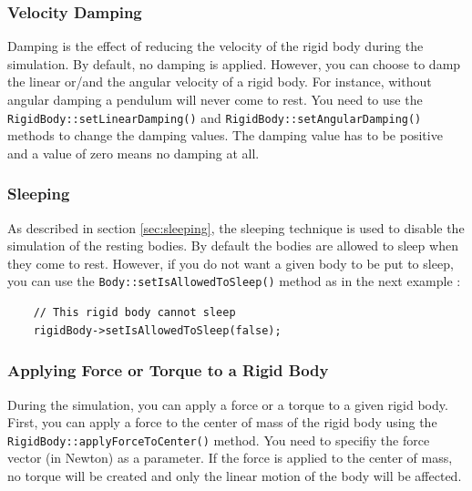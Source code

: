\documentclass[a4paper,12pt]{article}
\begin{document}
    \subsubsection{Velocity Damping}

    \begin{sloppypar}
        Damping is the effect of reducing the velocity of the rigid body during the simulation. By default, no damping is applied. However, you can choose to damp
        the linear or/and the angular velocity of a rigid body. For instance, without angular damping a pendulum will never come to rest. You need to use the
        \texttt{RigidBody::setLinearDamping()} and \texttt{RigidBody::setAngularDamping()} methods to change the damping values. The damping value has to be positive and
        a value of zero means no damping at all.
    \end{sloppypar}

    \subsubsection{Sleeping}
    \label{sec:rigidbodysleeping}

   As described in section \ref{sec:sleeping}, the sleeping technique is used to disable the simulation of the resting bodies. By default the bodies are allowed to sleep when they
   come to rest. However, if you do not want a given body to be put to sleep, you can use the \texttt{Body::setIsAllowedToSleep()} method as in the next example : \\

   \begin{lstlisting}
    // This rigid body cannot sleep
    rigidBody->setIsAllowedToSleep(false); 
 \end{lstlisting}

    \subsubsection{Applying Force or Torque to a Rigid Body}

    During the simulation, you can apply a force or a torque to a given rigid body. First, you can apply a force to the center of mass of the rigid body using the
    \texttt{RigidBody::applyForceToCenter()} method. You need to specifiy the force vector (in Newton) as a parameter. If the force is applied to the center of mass, no
    torque will be created and only the linear motion of the body will be affected. \\
\end{document}
